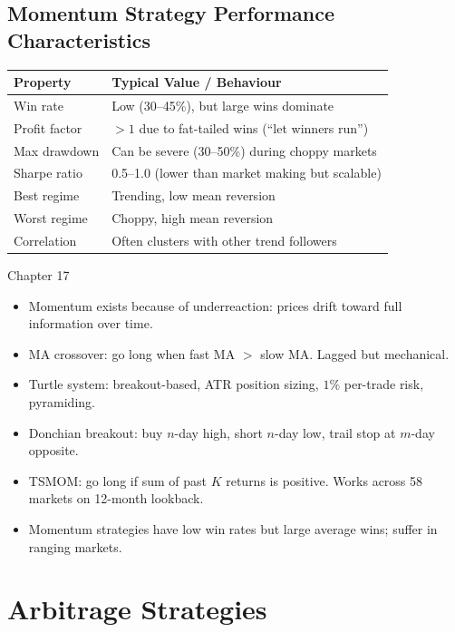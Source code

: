 \documentclass[12pt,a4paper,openany]{report}
\theoremstyle{definition}
\begin{document}
\section{Momentum Strategy Performance Characteristics}

\begin{center}
\begin{tabular}{ll}
\toprule
\textbf{Property} & \textbf{Typical Value / Behaviour} \\
\midrule
Win rate & Low (30--45\%), but large wins dominate \\
Profit factor & $> 1$ due to fat-tailed wins (``let winners run'') \\
Max drawdown & Can be severe (30--50\%) during choppy markets \\
Sharpe ratio & 0.5--1.0 (lower than market making but scalable) \\
Best regime & Trending, low mean reversion \\
Worst regime & Choppy, high mean reversion \\
Correlation & Often clusters with other trend followers \\
\bottomrule
\end{tabular}
\end{center}

\begin{takeawaybox}{Chapter 17}
\begin{itemize}
  \item Momentum exists because of underreaction: prices drift toward full information over time.
  \item MA crossover: go long when fast MA $>$ slow MA. Lagged but mechanical.
  \item Turtle system: breakout-based, ATR position sizing, $1\%$ per-trade risk, pyramiding.
  \item Donchian breakout: buy $n$-day high, short $n$-day low, trail stop at $m$-day opposite.
  \item TSMOM: go long if sum of past $K$ returns is positive. Works across 58 markets on 12-month lookback.
  \item Momentum strategies have low win rates but large average wins; suffer in ranging markets.
\end{itemize}
\end{takeawaybox}


\chapter{Arbitrage Strategies}
\end{document}
